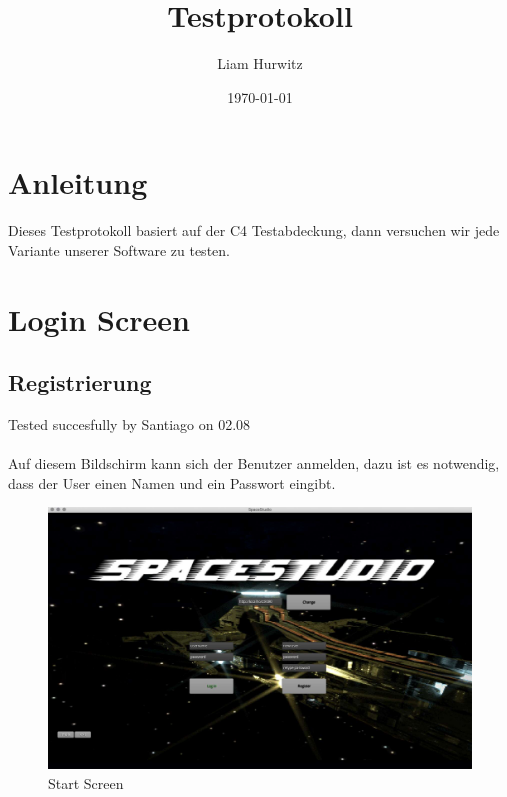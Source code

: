 \documentclass[12pt]{article}
\author{Liam Hurwitz}
\date{\today}
\title{Testprotokoll}
\begin{document}
\maketitle
\newpage
\tableofcontents

\newpage
\section{Anleitung}
Dieses Testprotokoll basiert auf der C4 Testabdeckung, dann versuchen wir jede Variante unserer Software zu testen.

\section{Login Screen}
\label{sec:orgc5dc561}
\subsection{Registrierung}
Tested succesfully by Santiago on 02.08\\\\
Auf diesem Bildschirm kann sich der Benutzer anmelden, dazu ist es notwendig, dass der User einen Namen und ein Passwort eingibt.\\
\begin{figure}[htp]
\centering
\includegraphics[scale=0.4]{TestProtocolBilder/startScreen.jpg}
\caption{Start Screen}
\end{figure}

\newpage
\end{document}
